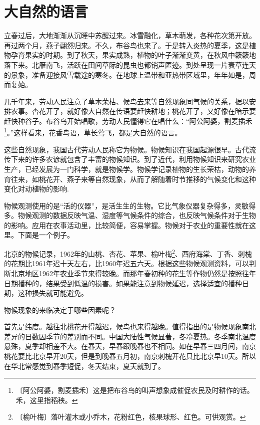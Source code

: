 \documentclass[12pt,UTF-8,openany]{ctexbook}
\begin{document}
\chapter{大自然的语言}

\begin{normalsize}
    
    立春过后，大地渐渐从沉睡中苏醒过来。冰雪融化，草木萌发，各种花次第开放。再过两个月，燕子翩然归来。不久，布谷鸟也来了。于是转入炎热的夏季，这是植物孕育果实的时期。到了秋天，果实成熟，植物的叶子渐渐变黄，在秋风中簌簌地落下来。北雁南飞，活跃在田间草际的昆虫也都销声匿迹。到处呈现一片衰草连天的景象，准备迎接风雪载途的寒冬。在地球上温带和亚热带区域里，年年如是，周而复始。
    
    几千年来，劳动人民注意了草木荣枯、候鸟去来等自然现象同气候的关系，据以安排农事。杏花开了，就好像大自然在传语要赶快耕地；桃花开了，又好像在暗示要赶快种谷子。布谷鸟开始唱歌，劳动人民懂得它在唱什么：“阿公阿婆，割麦插禾\footnote{〔阿公阿婆，割麦插禾〕这是把布谷鸟的叫声想象成催促农民及时耕作的话。禾，这里指稻秧。}。”这样看来，花香鸟语，草长莺飞，都是大自然的语言。
    
    这些自然现象，我国古代劳动人民称它为物候。物候知识在我国起源很早。古代流传下来的许多农谚就包含了丰富的物候知识。到了近代，利用物候知识来研究农业生产，已经发展为一门科学，就是物候学。物候学记录植物的生长荣枯，动物的养育往来，如桃花开、燕子来等自然现象，从而了解随着时节推移的气候变化和这种变化对动植物的影响.
    
    物候观测使用的是“活的仪器”，是活生生的生物。它比气象仪器复杂得多，灵敏得多。物候观测的数据反映气温、湿度等气候条件的综合，也反映气候条件对于生物的影响。应用在农事活动里，比较简便，容易掌握。物候对于农业的重要性就在这里。下面是一个例子。
    
    北京的物候记录，1962年的山桃、杏花、苹果、榆叶梅\footnote{〔榆叶梅〕落叶灌木或小乔木，花粉红色，核果球形、红色。可供观赏。}、西府海棠、丁香、刺槐的花期比1961年迟十天左右，比1960年迟五六天。根据这些物候观测资料，可以判断北京地区1962年农业季节来得较晚。而那年春初种的花生等作物仍然是按照往年日期播种的，结果受到低温的损害。如果能注意到物候延迟，选择适宜的播种日期，这种损失就可能避免。
    
    物候现象的来临决定于哪些因素呢？
    
    首先是纬度。越往北桃花开得越迟，候鸟也来得越晚。值得指出的是物候现象南北差异的日数因季节的差别而不同。中国大陆性气候显著，冬冷夏热。冬季南北温度悬殊，夏季却相差不大。在春天，早春跟晚春也不相同。如在早春三四月间，南京桃花要比北京早开20天，但是到晚春五月初，南京刺槐开花只比北京早10天。所以在华北常感觉到春季短促，冬天结束，夏天就到了。
    

\end{normalsize}
\end{document}
